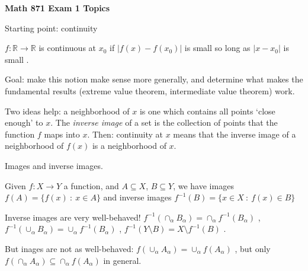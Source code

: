 \documentclass[12pt]{article}
\begin{document}
\def\ctln{\centerline}
\def\msk{\medskip}
\def\bsk{\bigskip}
\def\ssk{\smallskip}
\def\ra{\rightarrow}
\def\ubr{\underbar}
\def\sset{\subseteq}
\def\hsk{\hskip10pt}

\def\mt{{\mathcal T}}
\def\mb{{\mathcal B}}
\def\mbp{{\mathcal B}^\prime}
\def\mbpp{{\mathcal B}^{\prime\prime}}
\def\ms{{\mathcal S}}
\def\mu{{\mathcal U}}
\def\mv{{\mathcal V}}
\def\mp{{\mathcal P}}
\def\mtp{{\mathcal T}^\prime}
\def\mtpp{{\mathcal T}^{\prime\prime}}

\def\bbr{{\mathbb R}}
\def\bbz{{\mathbb Z}}
\def\bbq{{\mathbb Q}}
\def\spc{$~$\hskip.15in$~$}

\def\up{U^\prime}
\def\upp{U^{\prime\prime}}
\def\vp{V^\prime}
\def\vpp{V^{\prime\prime}}
\def\wp{W^\prime}
\def\wpp{W^{\prime\prime}}

\def\finv{f^{-1}}
\def\ginv{g^{-1}}
\def\hinv{h^{-1}}

\def\sset{\subseteq}
\def\lra{$\Leftrightarrow$}
\def\smin{\setminus}
\def\rta{\Rightarrow}


\ctln{\bf Math 871 Exam 1 Topics}

\msk

Starting point: continuity

$f:\bbr\ra\bbr$ is continuous at $x_0$ if $|f(x)-f(x_0)|$ is small
so long as $|x-x_0|$ is small .

Goal: make this notion make sense more generally, and determine what
makes the fundamental results (extreme value theorem, intermediate
value theorem) work.

Two ideas help: a neighborhood of $x$ is one which contains all
points `close enough' to $x$. The {\it inverse image} of a set
is the collection of points that the function $f$ maps into $x$.
Then: continuity at $x$ means that the inverse image of a neighborhood
of $f(x)$ is a neighborhood of $x$.

\msk

Images and inverse images.

Given $f:X\ra Y$ a function, and $A\subseteq X$, $B\subseteq Y$, we have
images $f(A) = \{f(x)\ :\ x\in A\}$ and inverse images $f^{-1}(B) = \{x\in X\ :\ f(x)\in B\}$

Inverse images are very well-behaved! 
$f^{-1}(\cap_\alpha B_\alpha) = \cap_\alpha f^{-1}(B_\alpha)$ , 
$f^{-1}(\cup_\alpha B_\alpha) = \cup_\alpha f^{-1}(B_\alpha)$ ,
$f^{-1}(Y\setminus B) = X\setminus f^{-1}(B)$ .

But inages are not as well-behaved: $f(\cup_\alpha A_\alpha) = \cup_\alpha f(A_\alpha)$ ,
but only $f(\cap_\alpha A_\alpha) \subseteq \cap_\alpha f(A_\alpha)$ in general.
\end{document}
